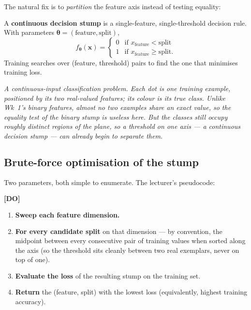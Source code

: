 \documentclass[11pt, a4paper]{article}
\newcommand{\doflag}{\textcolor{defBd}{\textbf{[DO]}}\,}
\begin{document}
The natural fix is to \emph{partition} the feature axis instead of testing equality:

\begin{defbox}
A \textbf{continuous decision stump} is a single-feature, single-threshold decision rule. With parameters $\boldsymbol\theta = (\text{feature}, \text{split})$,
\[
f_{\boldsymbol\theta}(\mathbf{x}) =
\begin{cases}
0 & \text{if } x_{\text{feature}} < \text{split} \\
1 & \text{if } x_{\text{feature}} \ge \text{split}.
\end{cases}
\]
Training searches over (feature, threshold) pairs to find the one that minimises training loss.
\end{defbox}

\begin{center}

\footnotesize\textit{A continuous-input classification problem. Each dot is one training example, positioned by its two real-valued features; its colour is its true class. Unlike Wk~1's binary features, almost no two examples share an exact value, so the equality test of the binary stump is useless here. But the classes still occupy roughly distinct regions of the plane, so a threshold on one axis --- a continuous decision stump --- can already begin to separate them.}
\end{center}

\subsection{Brute-force optimisation of the stump}

Two parameters, both simple to enumerate. The lecturer's pseudocode:

\doflag{}
\begin{enumerate}
  \item \textbf{Sweep each feature dimension.}
  \item \textbf{For every candidate split} on that dimension — by convention, the midpoint between every consecutive pair of training values when sorted along the axis (so the threshold sits cleanly between two real exemplars, never on top of one).
  \item \textbf{Evaluate the loss} of the resulting stump on the training set.
  \item \textbf{Return} the (feature, split) with the lowest loss (equivalently, highest training accuracy).
\end{enumerate}
\end{document}
